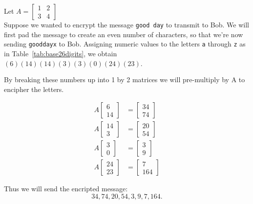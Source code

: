 \begin{example}
Let $A = 
\begin{bmatrix}
    1 & 2  \\
    3 & 4 
\end{bmatrix}$\\
Suppose we wanted to encrypt the message {\tt good day} to transmit to Bob. We will first pad the message to create an even number of characters, so that we're now sending {\tt gooddayx} to Bob.  Assigning numeric values to the letters {\tt a} through {\tt z} as in Table~\ref{tab:base26digits}, we obtain $(6)(14)(14)(3)(3)(0)(24)(23)$.
 
 By breaking these numbers up into 1 by 2 matrices we will pre-multiply by A to encipher the letters.
 
 \begin{align*} 
 A
 \begin{bmatrix}
    6 \\
    14 
\end{bmatrix} &= 
\begin{bmatrix}
    34 \\
    74
\end{bmatrix}\\
A
 \begin{bmatrix}
    14\\
    3 
\end{bmatrix} &= 
\begin{bmatrix}
    20\\
    54
\end{bmatrix}\\
A
 \begin{bmatrix}
    3 \\
    0 
\end{bmatrix} &= 
\begin{bmatrix}
    3 \\
    9
\end{bmatrix}\\
A
 \begin{bmatrix}
    24 \\
    23
\end{bmatrix} &= 
\begin{bmatrix}
    7 \\
    164
\end{bmatrix}
\end{align*}

Thus we will send the encripted message: \[34, 74, 20, 54, 3, 9, 7, 164.\]

\end{example}

